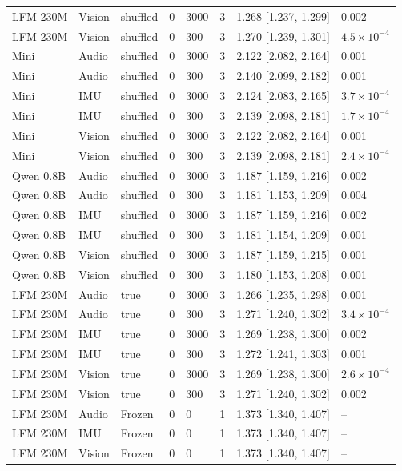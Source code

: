 {\begin{longtable}{@{}llllllll@{}}
LFM 230M & Vision & shuffled & 0 & 3000 & 3 & 1.268 [1.237, 1.299] & 0.002 \\
LFM 230M & Vision & shuffled & 0 & 300 & 3 & 1.270 [1.239, 1.301] & $4.5\times10^{-4}$ \\
Mini & Audio & shuffled & 0 & 3000 & 3 & 2.122 [2.082, 2.164] & 0.001 \\
Mini & Audio & shuffled & 0 & 300 & 3 & 2.140 [2.099, 2.182] & 0.001 \\
Mini & IMU & shuffled & 0 & 3000 & 3 & 2.124 [2.083, 2.165] & $3.7\times10^{-4}$ \\
Mini & IMU & shuffled & 0 & 300 & 3 & 2.139 [2.098, 2.181] & $1.7\times10^{-4}$ \\
Mini & Vision & shuffled & 0 & 3000 & 3 & 2.122 [2.082, 2.164] & 0.001 \\
Mini & Vision & shuffled & 0 & 300 & 3 & 2.139 [2.098, 2.181] & $2.4\times10^{-4}$ \\
Qwen 0.8B & Audio & shuffled & 0 & 3000 & 3 & 1.187 [1.159, 1.216] & 0.002 \\
Qwen 0.8B & Audio & shuffled & 0 & 300 & 3 & 1.181 [1.153, 1.209] & 0.004 \\
Qwen 0.8B & IMU & shuffled & 0 & 3000 & 3 & 1.187 [1.159, 1.216] & 0.002 \\
Qwen 0.8B & IMU & shuffled & 0 & 300 & 3 & 1.181 [1.154, 1.209] & 0.001 \\
Qwen 0.8B & Vision & shuffled & 0 & 3000 & 3 & 1.187 [1.159, 1.215] & 0.001 \\
Qwen 0.8B & Vision & shuffled & 0 & 300 & 3 & 1.180 [1.153, 1.208] & 0.001 \\
LFM 230M & Audio & true & 0 & 3000 & 3 & 1.266 [1.235, 1.298] & 0.001 \\
LFM 230M & Audio & true & 0 & 300 & 3 & 1.271 [1.240, 1.302] & $3.4\times10^{-4}$ \\
LFM 230M & IMU & true & 0 & 3000 & 3 & 1.269 [1.238, 1.300] & 0.002 \\
LFM 230M & IMU & true & 0 & 300 & 3 & 1.272 [1.241, 1.303] & 0.001 \\
LFM 230M & Vision & true & 0 & 3000 & 3 & 1.269 [1.238, 1.300] & $2.6\times10^{-4}$ \\
LFM 230M & Vision & true & 0 & 300 & 3 & 1.271 [1.240, 1.302] & 0.002 \\
LFM 230M & Audio & Frozen & 0 & 0 & 1 & 1.373 [1.340, 1.407] & -- \\
LFM 230M & IMU & Frozen & 0 & 0 & 1 & 1.373 [1.340, 1.407] & -- \\
LFM 230M & Vision & Frozen & 0 & 0 & 1 & 1.373 [1.340, 1.407] & -- \\

\end{longtable}}
